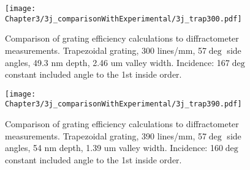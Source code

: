 \begin{figure}[htbp] %
   \centering
   \texttt{[image: Chapter3/3j\_comparisonWithExperimental/3j\_trap300.pdf]} 
   \caption{Comparison of grating efficiency calculations to diffractometer measurements.  Trapezoidal grating, 300 lines/mm, 57$\deg$ side angles, 49.3 nm depth, 2.46 um valley width.  Incidence: 167$\deg$ constant included angle to the 1st inside order.}
   \label{3j-3}
\end{figure}

\begin{figure}[htbp] %
   \centering
   \texttt{[image: Chapter3/3j\_comparisonWithExperimental/3j\_trap390.pdf]} 
   \caption{Comparison of grating efficiency calculations to diffractometer measurements.  Trapezoidal grating, 390 lines/mm, 57$\deg$ side angles, 54 nm depth, 1.39 um valley width.  Incidence: 160$\deg$ constant included angle to the 1st inside order.}
   \label{3j-4}
\end{figure}
